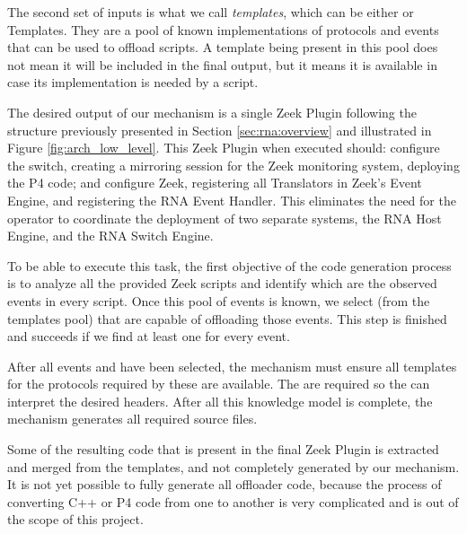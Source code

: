 The second set of inputs is what we call \textit{templates}, which can be either  \ProtocolTemplates{} or \Offloader{} Templates. They are a pool of known implementations of protocols and events that can be used to offload scripts. A template being present in this pool does not mean it will be included in the final output, but it means it is available in case its implementation is needed by a script.

The desired output of our mechanism is a single Zeek Plugin following the structure previously presented in Section \ref{sec:rna:overview} and illustrated in Figure \ref{fig:arch_low_level}. This Zeek Plugin when executed should: configure the switch, creating a mirroring session for the Zeek monitoring system, deploying the P4 code; and configure Zeek, registering all Translators in Zeek's Event Engine, and registering the RNA Event Handler. This eliminates the need for the operator to coordinate the deployment of two separate systems, the RNA Host Engine, and the RNA Switch Engine.

To be able to execute this task, the first objective of the code generation process is to analyze all the provided Zeek scripts and identify which are the observed events in every script. Once this pool of events is known, we select \Offloaders{} (from the templates pool) that are capable of offloading those events. This step is finished and succeeds if we find at least one \Offloader{} for every event.

After all events and \Offloaders{} have been selected, the mechanism must ensure all templates for the protocols required by these \Offloaders{} are available. The \ProtocolTemplates{} are required so the \Offloaders{} can interpret the desired headers. After all this knowledge model is complete, the mechanism generates all required source files.

Some of the resulting code that is present in the final Zeek Plugin is extracted and merged from the templates, and not completely generated by our mechanism. It is not yet possible to fully generate all offloader code, because the process of converting C++ or P4 code from one to another is very complicated and is out of the scope of this project.


% 
% 


